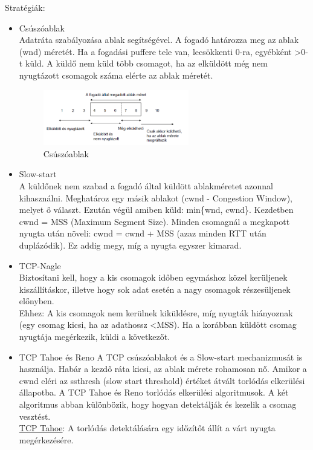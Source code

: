 \documentclass[margin=0px]{article}
\begin{document}
\begin{description}
				Stratégiák:
				\begin{itemize}
					\item Csúszóablak \\
						Adatráta szabályozása ablak segítségével. A fogadó határozza meg az ablak (wnd) méretét. Ha a fogadási puffere tele van, lecsökkenti 0-ra, egyébként \textgreater0-t küld. A küldő nem küld több csomagot, ha az elküldött még nem nyugtázott csomagok száma elérte az ablak méretét. 	
						\begin{figure}[H]
							\centering
							\includegraphics[width=0.6\textwidth]{img/csuszoablak.png}
							\caption{Csúszóablak}
						\end{figure}
					\item Slow-start \\
						A küldőnek nem szabad a fogadó által küldött ablakméretet azonnal kihasználni. Meghatároz egy másik ablakot (cwnd - Congestion Window), melyet ő választ. Ezután végül amiben küld: min\{wnd, cwnd\}. Kezdetben cwnd = MSS (Maximum Segment Size). Minden csomagnál a megkapott nyugta után növeli: cwnd = cwnd + MSS (azaz minden RTT után duplázódik). Ez addig megy, míg a nyugta egyszer kimarad.
					\item TCP-Nagle \\
						Biztosítani kell, hogy a kis csomagok időben egymáshoz közel kerüljenek kiszállításkor, illetve hogy sok adat esetén a nagy csomagok részesüljenek előnyben. \\
						Ehhez: A kis csomagok nem kerülnek kiküldésre, míg nyugták hiányoznak (egy csomag kicsi, ha az adathossz \textless MSS). Ha a korábban küldött csomag nyugtája megérkezik, küldi a következőt.
					\item TCP Tahoe és Reno
						A TCP csúszóablakot és a Slow-start mechanizmusát is használja. Habár a kezdő ráta kicsi, az ablak mérete rohamosan nő. Amikor a cwnd eléri az ssthresh (slow start threshold) értéket átvált torlódás elkerülési állapotba. A TCP Tahoe és Reno torlódás elkerülési algoritmusok. A két algoritmus abban különbözik, hogy hogyan detektálják és kezelik a csomag vesztést. \\
						\underline{TCP Tahoe}: A torlódás detektálására egy időzítőt állít a várt nyugta megérkezésére. 

\end{itemize}
\end{description}
\end{document}
